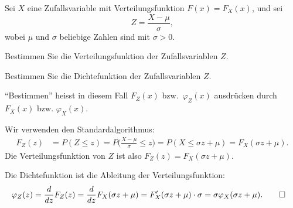 Sei $X$ eine Zufallsvariable mit Verteilungsfunktion $F(x)=F_X(x)$, und
sei
\[
Z=\frac{X-\mu}{\sigma},
\]
wobei $\mu$ und $\sigma$ beliebige Zahlen sind mit $\sigma > 0$.

\begin{teilaufgaben}
\item Bestimmen Sie die Verteilungsfunktion der Zufallsvariablen $Z$.
\item Bestimmen Sie die Dichtefunktion der Zufallsvariablen $Z$.
\end{teilaufgaben}
\begin{hinweis}
``Bestimmen'' heisst in diesem Fall $F_Z(x)$ bzw.~$\varphi_Z(x)$ ausdrücken durch
$F_X(x)$ bzw. $\varphi_X(x)$.
\end{hinweis}


\begin{loesung}
\begin{teilaufgaben}
\item Wir verwenden den Standardalgorithmus:
\begin{align*}
F_Z(z)&=P(Z\le z)
=P\biggl(\frac{X-\mu}{\sigma}\le z\biggr)
=P(X\le \sigma z+\mu)=F_X(\sigma z+\mu).
\end{align*}
Die Verteilungsfunktion von $Z$ ist also $F_Z(z)=F_X(\sigma z+\mu)$.
\item Die Dichtefunktion ist die Ableitung der Verteilungsfunktion:
\begin{align*}
\varphi_Z(z)&=\frac{d}{dz}F_Z(z)
=\frac{d}{dz}F_X(\sigma z+ \mu)
=F_X'(\sigma z+ \mu)\cdot \sigma=\sigma\varphi_X(\sigma z+\mu).
\qedhere
\end{align*}
\end{teilaufgaben}
\end{loesung}

